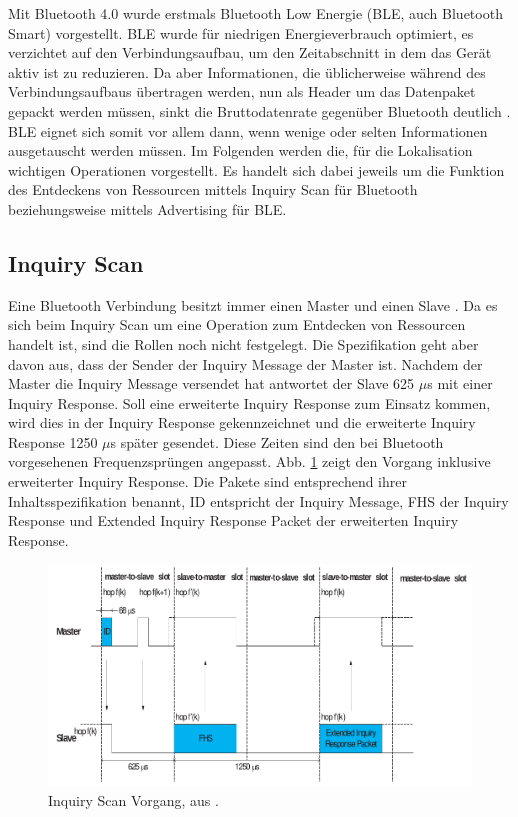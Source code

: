 Mit Bluetooth 4.0 wurde erstmals Bluetooth Low Energie (BLE, auch Bluetooth Smart) vorgestellt.
BLE wurde für niedrigen Energieverbrauch optimiert, es verzichtet auf den Verbindungsaufbau, um den Zeitabschnitt in dem das Gerät aktiv ist zu reduzieren.
Da aber Informationen, die üblicherweise während des Verbindungsaufbaus übertragen werden, nun als Header um das Datenpaket gepackt werden müssen, sinkt die Bruttodatenrate gegenüber Bluetooth deutlich \cite{rigado2016practical}. 
BLE eignet sich somit vor allem dann, wenn wenige oder selten Informationen ausgetauscht werden müssen.
Im Folgenden werden die, für die Lokalisation wichtigen Operationen vorgestellt.
Es handelt sich dabei jeweils um die Funktion des Entdeckens von Ressourcen mittels Inquiry Scan für Bluetooth beziehungsweise mittels Advertising für BLE.

\subsection{Inquiry Scan}
Eine Bluetooth Verbindung besitzt immer einen Master und einen Slave \cite{blue2010inquiry}.
Da es sich beim Inquiry Scan um eine Operation zum Entdecken von Ressourcen handelt ist, sind die Rollen noch nicht festgelegt. 
Die Spezifikation geht aber davon aus, dass der Sender der Inquiry Message der Master ist.
Nachdem der Master die Inquiry Message versendet hat antwortet der Slave 625 $\mu$s mit einer Inquiry Response. 
Soll eine erweiterte Inquiry Response zum Einsatz kommen, wird dies in der Inquiry Response gekennzeichnet und die erweiterte Inquiry Response 1250 $\mu$s später gesendet.
Diese Zeiten sind den bei Bluetooth vorgesehenen Frequenzsprüngen angepasst.
Abb. \ref{fig:inqscan} zeigt den Vorgang inklusive erweiterter Inquiry Response.
Die Pakete sind entsprechend ihrer Inhaltsspezifikation benannt, ID entspricht der Inquiry Message, FHS der Inquiry Response und Extended Inquiry Response Packet der erweiterten Inquiry Response.

\begin{figure}[h]
  \centering
	\includegraphics[width=\textwidth]{images/inqscan.png}
  \caption{Inquiry Scan Vorgang, aus \cite{blue2010inquiry}.}
  \label{fig:inqscan}
\end{figure}

